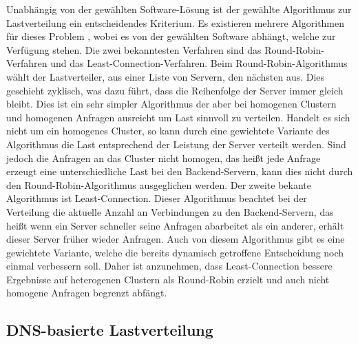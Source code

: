 \documentclass[a4paper, 12pt, BCOR10mm, DIV12, toc=bibliography, toc=listof, german]{scrbook}
\begin{document}
			Unabhängig von der gewählten Software-Lösung ist der gewählte Algorithmus zur Lastverteilung
			ein entscheidendes Kriterium. Es existieren mehrere Algorithmen für dieses Problem
			\cite{zinke2007}, wobei es von der gewählten Software abhängt, welche zur Verfügung stehen.
			Die zwei bekanntesten Verfahren sind das Round-Robin-Verfahren und das
			Least-Connection-Verfahren. Beim Round-Robin-Algorithmus wählt der Lastverteiler, aus einer
			Liste von Servern, den nächsten aus. Dies geschieht zyklisch, was dazu führt, dass die
			Reihenfolge der Server immer gleich bleibt. Dies ist ein sehr simpler Algorithmus der aber bei
			homogenen Clustern und homogenen Anfragen ausreicht um Last sinnvoll zu verteilen. Handelt es
			sich nicht um ein homogenes Cluster, so kann durch eine gewichtete Variante des Algorithmus
			die Last entsprechend der Leistung der Server verteilt werden. Sind jedoch die Anfragen an das
			Cluster nicht homogen, das heißt jede Anfrage erzeugt eine unterschiedliche Last bei den
			Backend-Servern, kann dies nicht durch den Round-Robin-Algorithmus ausgeglichen werden. Der
			zweite bekante Algorithmus ist Least-Connection. Dieser Algorithmus beachtet bei der
			Verteilung die aktuelle Anzahl an Verbindungen zu den Backend-Servern, das heißt wenn ein
			Server schneller seine Anfragen abarbeitet als ein anderer, erhält dieser Server früher wieder
			Anfragen. Auch von diesem Algorithmus gibt es eine gewichtete Variante, welche die bereits
			dynamisch getroffene Entscheidung noch einmal verbessern soll. Daher ist anzunehmen, dass
			Least-Connection bessere Ergebnisse auf heterogenen Clustern als Round-Robin erzielt und auch
			nicht homogene Anfragen begrenzt abfängt.


			\subsection*{DNS-basierte Lastverteilung} %
\end{document}
